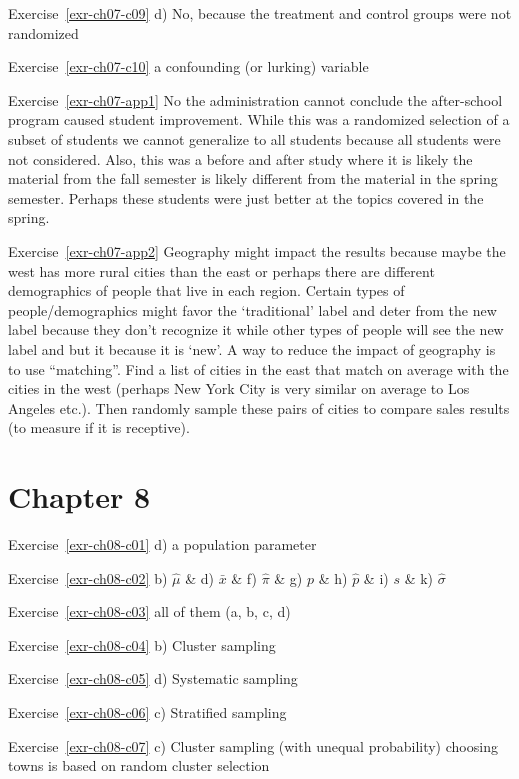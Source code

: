 \documentclass[
  letterpaper,
  DIV=11,
  numbers=noendperiod]{scrreprt}
\theoremstyle{definition}
\theoremstyle{remark}
\begin{document}
Exercise~\ref{exr-ch07-c09} d) No, because the treatment and control
groups were not randomized

Exercise~\ref{exr-ch07-c10} a confounding (or lurking) variable

Exercise~\ref{exr-ch07-app1} No the administration cannot conclude the
after-school program caused student improvement. While this was a
randomized selection of a subset of students we cannot generalize to all
students because all students were not considered. Also, this was a
before and after study where it is likely the material from the fall
semester is likely different from the material in the spring semester.
Perhaps these students were just better at the topics covered in the
spring.

Exercise~\ref{exr-ch07-app2} Geography might impact the results because
maybe the west has more rural cities than the east or perhaps there are
different demographics of people that live in each region. Certain types
of people/demographics might favor the `traditional' label and deter
from the new label because they don't recognize it while other types of
people will see the new label and but it because it is `new'. A way to
reduce the impact of geography is to use ``matching''. Find a list of
cities in the east that match on average with the cities in the west
(perhaps New York City is very similar on average to Los Angeles etc.).
Then randomly sample these pairs of cities to compare sales results (to
measure if it is receptive).

\hypertarget{sec-ex08-sol}{%
\section{Chapter 8}\label{sec-ex08-sol}}

Exercise~\ref{exr-ch08-c01} d) a population parameter

Exercise~\ref{exr-ch08-c02} b) \(\hat{\mu}\) \& d) \(\bar{x}\) \& f)
\(\hat{\pi}\) \& g) \(p\) \& h) \(\hat{p}\) \& i) \(s\) \& k)
\(\hat{\sigma}\)

Exercise~\ref{exr-ch08-c03} all of them (a, b, c, d)

Exercise~\ref{exr-ch08-c04} b) Cluster sampling

Exercise~\ref{exr-ch08-c05} d) Systematic sampling

Exercise~\ref{exr-ch08-c06} c) Stratified sampling

Exercise~\ref{exr-ch08-c07} c) Cluster sampling (with unequal
probability) choosing towns is based on random cluster selection
\end{document}
